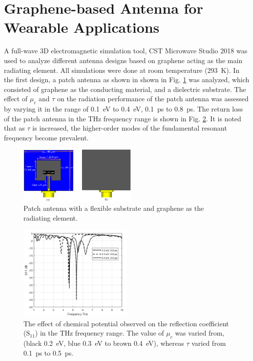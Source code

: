 \documentclass[12pt]{suhbook}
\begin{document}
\section{Graphene-based Antenna for Wearable Applications}
% 
A full-wave 3D electromagnetic simulation tool, CST Microwave Studio 2018 was used to analyze different antenna designs based on graphene acting as the main radiating element. All simulations were done at room temperature (\SI{293}{\kelvin}). In the first design, a patch antenna as shown in shown in Fig. \ref{Fig 1} was analyzed, which consisted of graphene as the conducting material, and a dielectric substrate. The effect of $\mu_c$ and $\tau$ on the radiation performance of the patch antenna was assessed by varying it in the range of \SI{0.1}{\eV} to \SI{0.4}{\eV},  \SI{0.1}{\ps} to \SI{0.8}{\ps}. The return loss of the patch antenna in the THz frequency range is shown in Fig. \ref{Fig 2}. It is noted that as $\tau$ is increased, the higher-order modes of the fundamental resonant frequency become prevalent.
% 
\begin{figure}[hbt!]
    \centering
    \includegraphics[width=0.52\textwidth]{1}
    \caption{Patch antenna with a flexible substrate and graphene as the radiating element.}
    \label{Fig 1}
\end{figure}
% 
\begin{figure}[h]
    \centering    \includegraphics[width=0.5\textwidth]{2}
    \caption{The effect of chemical potential observed on the reflection coefficient ($\mathrm{S_{11}}$) in the THz frequency range. The value of $\mu_c$ was varied from, (black \SI{.2}{\eV}, blue \SI{.3}{\eV} to brown \SI{.4}{\eV}), whereas $\tau$ varied from \SI{.1}{\ps} to \SI{.5}{\ps}. }
    \label{Fig 2}
\end{figure}
\end{document}

